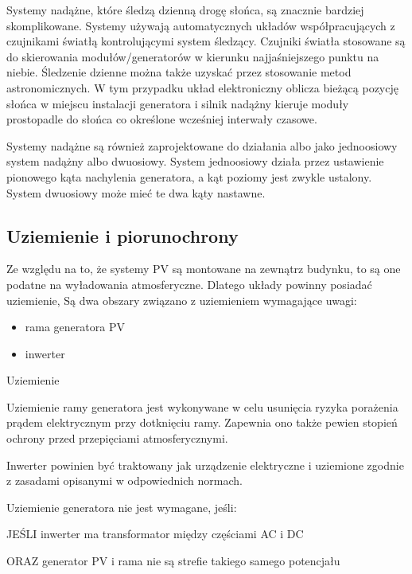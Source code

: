 \documentclass[12pt,a4paper]{article}
\begin{document}
 

Systemy nadążne, które śledzą dzienną drogę słońca, są znacznie bardziej 
skomplikowane. Systemy używają automatycznych układów współpracujących z 
czujnikami światłą kontrolującymi system śledzący. Czujniki światła 
stosowane są do skierowania modułów/generatorów w kierunku 
najjaśniejszego punktu na niebie. Śledzenie dzienne można także uzyskać 
przez stosowanie metod astronomicznych. W tym przypadku układ 
elektroniczny oblicza bieżącą pozycję słońca w miejscu instalacji 
generatora i silnik nadążny kieruje moduły prostopadle do słońca co 
określone wcześniej interwały czasowe. 

 

Systemy nadążne są również zaprojektowane do działania albo jako 
jednoosiowy system nadążny albo dwuosiowy. System jednoosiowy działa 
przez ustawienie pionowego kąta nachylenia generatora, a kąt poziomy 
jest zwykle ustalony. System dwuosiowy może mieć te dwa kąty nastawne. 

 

\subsection{Uziemienie i piorunochrony }


Ze względu na to, że systemy PV są montowane na zewnątrz budynku, to są 
one podatne na wyładowania atmosferyczne. Dlatego układy powinny 
posiadać uziemienie, Są dwa obszary związano z uziemieniem wymagające 
uwagi: 

\begin{itemize}
\item rama generatora PV 
\item inwerter 
\end{itemize}

Uziemienie 

Uziemienie ramy generatora jest wykonywane w celu usunięcia ryzyka 
porażenia prądem elektrycznym przy dotknięciu ramy. Zapewnia ono także 
pewien stopień ochrony przed przepięciami atmosferycznymi. 

Inwerter powinien być traktowany jak urządzenie elektryczne i uziemione 
zgodnie z zasadami opisanymi w odpowiednich normach. 

 

Uziemienie generatora nie jest wymagane, jeśli: 

JEŚLI inwerter ma transformator między częściami AC i DC 

ORAZ generator PV i rama nie są strefie takiego samego potencjału 
\end{document}
